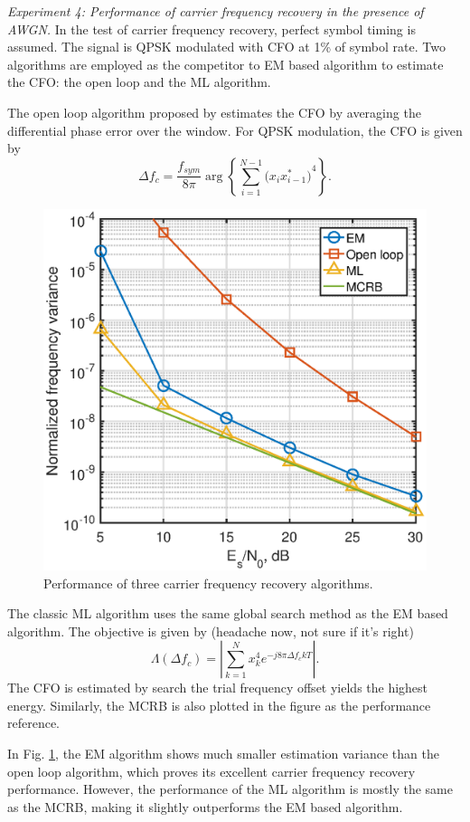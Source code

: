 \documentclass[journal,comsoc]{IEEEtran}
\begin{document}
\textit{Experiment 4:
Performance of carrier frequency recovery in the presence of AWGN.}
In the test of carrier frequency recovery, perfect symbol timing is assumed.
The signal is QPSK modulated with CFO at 1\% of symbol rate.
Two algorithms are employed as the competitor to EM based algorithm to estimate the CFO:
the open loop and the ML algorithm.

The open loop algorithm proposed by \cite{Chuang1991} estimates the CFO  by averaging the differential phase error over the window.
For QPSK modulation, the CFO is given by
\begin{equation}
\Delta f_c = \frac{f_{sym}}{8 \pi } \arg \left\{ {\sum\limits_{i = 1}^{{N} - 1} {{{\big( {x_i x^*_{i-1}} \big)}^4}} } \right\}.
\end{equation}

\begin{figure}[ht]
\centering
\includegraphics[width=3 in]{pic/per_freq.eps}
\caption{Performance of three carrier frequency recovery algorithms.}
\label{fig:per_freq} 
\end{figure} 

The classic ML algorithm uses the same global search method as the EM based algorithm.
The objective is given by (headache now, not sure if it's right) 
\begin{equation}
\Lambda ({\Delta f_c })=\left| \sum\limits_{k = 1}^N {{{ {{x^4_k}e^{-j8\pi \Delta f_c k T}}}}} \right|. 
\end{equation}
The CFO is estimated by search the trial frequency offset yields the highest energy.
Similarly, the MCRB is also plotted in the figure as the performance reference.

In Fig. \ref{fig:per_freq}, the EM algorithm shows much smaller estimation variance than the open loop algorithm, which proves its excellent carrier frequency recovery performance.
However, the performance of the ML algorithm is mostly the same as the MCRB, making it slightly outperforms the EM based algorithm.
\end{document}
